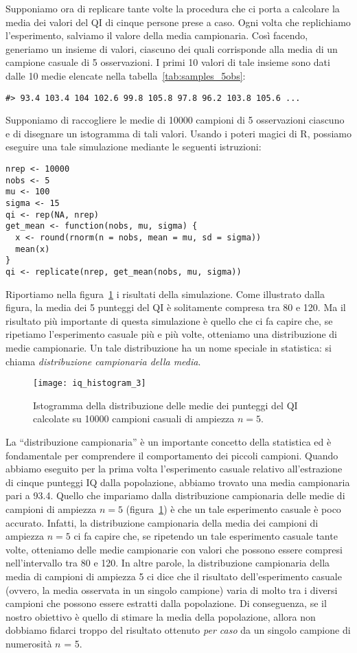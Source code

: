 Supponiamo ora di replicare tante volte la procedura che ci porta a calcolare la media dei valori del QI di cinque persone prese a caso.
Ogni volta che replichiamo l'esperimento, salviamo il valore della media campionaria. 
Così facendo, generiamo un insieme di valori, ciascuno dei quali corrisponde alla media di un campione casuale di 5 osservazioni. 
I primi 10 valori di tale insieme sono dati dalle 10 medie elencate nella tabella~\ref{tab:samples_5obs}:
\begin{lstlisting}
#> 93.4 103.4 104 102.6 99.8 105.8 97.8 96.2 103.8 105.6 ...
\end{lstlisting} 
\noindent
Supponiamo di raccogliere le medie di \num{10000} campioni di 5 osservazioni ciascuno e  di disegnare un istogramma di tali valori. 
Usando i poteri magici di R, possiamo eseguire una tale simulazione mediante le seguenti istruzioni:
\begin{lstlisting}
nrep <- 10000
nobs <- 5
mu <- 100
sigma <- 15
qi <- rep(NA, nrep)
get_mean <- function(nobs, mu, sigma) {
  x <- round(rnorm(n = nobs, mean = mu, sd = sigma))
  mean(x)
}
qi <- replicate(nrep, get_mean(nobs, mu, sigma))
\end{lstlisting}
\noindent
Riportiamo nella figura~\ref{fig:qi_hist_3} i risultati della simulazione.
Come illustrato dalla figura, la media dei 5 punteggi del QI è solitamente  compresa tra 80 e 120. 
Ma il risultato più importante di questa simulazione è quello che ci fa capire che, se ripetiamo l'esperimento casuale più e più volte, otteniamo una distribuzione di medie campionarie.  
Un tale distribuzione ha un nome speciale in statistica: si chiama \emph{distribuzione campionaria della media}.

\begin{figure}[h!]
\centering
\texttt{[image: iq\_histogram\_3]}
\caption{Istogramma della distribuzione delle medie dei punteggi del QI calcolate su  \num{10000} campioni casuali di ampiezza $n=5$.}
\label{fig:qi_hist_3}
\end{figure}
La \enquote{distribuzione campionaria} è un importante concetto della statistica ed è fondamentale per comprendere il comportamento dei piccoli campioni. 
Quando abbiamo eseguito per la prima volta l'esperimento casuale relativo all'estrazione di cinque punteggi IQ dalla popolazione, abbiamo trovato una media campionaria pari a 93.4. 
Quello che impariamo dalla distribuzione campionaria delle medie di campioni di ampiezza $n = 5$ (figura~\ref{fig:qi_hist_3}) è che un tale esperimento casuale è poco accurato. 
Infatti, la distribuzione campionaria della media dei campioni di ampiezza $n=5$ ci fa capire che, se ripetendo un tale esperimento casuale tante volte, otteniamo delle medie campionarie con valori che possono essere compresi nell'intervallo tra 80 e 120.
In altre parole, la distribuzione campionaria della media di campioni di ampiezza 5 ci dice che il risultato dell'esperimento casuale (ovvero, la media osservata in un singolo campione) varia di molto tra i diversi campioni che possono essere estratti dalla popolazione.
Di conseguenza, se il nostro obiettivo è quello di stimare la media della popolazione, allora non dobbiamo fidarci troppo del risultato ottenuto \emph{per caso} da un singolo campione di numerosità $n$ = 5.

